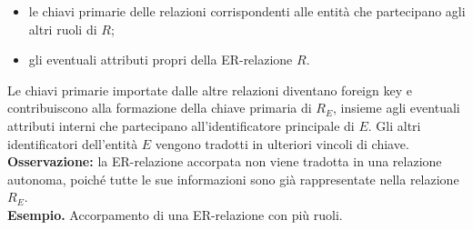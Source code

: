 \begin{itemize}
    \item le chiavi primarie delle relazioni
    corrispondenti alle entità che partecipano
    agli altri ruoli di $R$;

    \item gli eventuali attributi propri
    della ER-relazione $R$.
\end{itemize}
\noindent
Le chiavi primarie importate dalle altre
relazioni diventano foreign key e contribuiscono
alla formazione della chiave primaria di $R_E$,
insieme agli eventuali attributi interni che
partecipano all'identificatore principale di $E$.
Gli altri identificatori dell'entità $E$
vengono tradotti in ulteriori vincoli di chiave.\medskip\\
\noindent
\textbf{Osservazione:} la ER-relazione accorpata
non viene tradotta in una relazione autonoma,
poiché tutte le sue informazioni sono già
rappresentate nella relazione $R_E$.\medskip\\
\noindent
\textcolor{verdeEsempio}{\textbf{Esempio. }}
Accorpamento di una ER-relazione con più ruoli.

